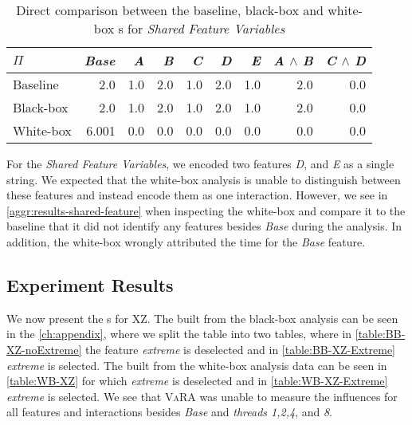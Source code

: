 \begin{table}[H]
    \centering
    \begin{tabular}{lrrrrrrrr}
    \toprule
    $\Pi$    & \emph{Base} & \emph{A} & \emph{B} & \emph{C} & \emph{D} & \emph{E}& \emph{A} $\land$ \emph{B} & \emph{C} $\land$ \emph{D}  \\ \midrule
    Baseline & 2.0    & 1.0 & 2.0 & 1.0 & 2.0 & 1.0 & 2.0           & 0.0           \\
    Black-box &  2.0    & 1.0 & 2.0 & 1.0 & 2.0 & 1.0 & 2.0           & 0.0           \\
    White-box  &  6.001 &  0.0 &  0.0 &  0.0 &  0.0 &  0.0 &     0.0 &     0.0\\\bottomrule
    \end{tabular}  
    \caption{Direct comparison between the baseline, black-box and white-box {\perfInfluenceModel}s for \emph{Shared Feature Variables}}
    \label{aggr:results-shared-feature}
\end{table}

For the \emph{Shared Feature Variables}, we encoded two features \emph{D}, and \emph{E} as a single string. 
We expected that the white-box analysis is unable to distinguish between these features and instead encode them as one interaction. 
However, we see in \autoref{aggr:results-shared-feature} when inspecting the white-box {\perfInfluenceModel}
and compare it to the baseline that it did not identify any features besides \emph{Base} during the analysis. 
In addition, the white-box {\perfInfluenceModel} wrongly attributed the time for the \emph{Base} feature.

\subsection{Experiment Results}

We now present the {\perfInfluenceModel}s for \textsc{XZ}. The {\perfInfluenceModel} built from the black-box analysis can be seen
in the \autoref{ch:appendix}, where we split the table into two tables, where in \autoref{table:BB-XZ-noExtreme} the feature \emph{extreme} is 
deselected and in \autoref{table:BB-XZ-Extreme} \emph{extreme} is selected. The {\perfInfluenceModel} built from the white-box analysis data
can be seen in \autoref{table:WB-XZ} for which \emph{extreme} is deselected and in \autoref{table:WB-XZ-Extreme} \emph{extreme} is selected.
We see that \textsc{VaRA} was unable to measure the influences for all features and interactions besides \emph{Base} and \emph{threads 1,2,4}, and \emph{8}.


